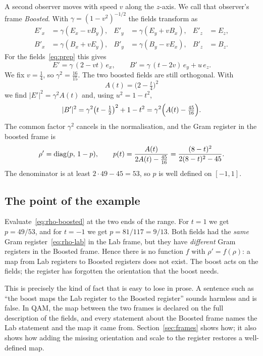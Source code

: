 A second observer moves with speed $v$ along the $z$-axis. We call that observer's frame \emph{Boosted}. With
$\gamma=(1-v^2)^{-1/2}$ the fields transform as
\[
\begin{aligned}
E'_x&=\gamma(E_x-vB_y), & E'_y&=\gamma(E_y+vB_x), & E'_z&=E_z,\\
B'_x&=\gamma(B_x+vE_y), & B'_y&=\gamma(B_y-vE_x), & B'_z&=B_z .
\end{aligned}
\]
For the fields~\eqref{eq:prep} this gives
\[
E' = \gamma\,(2-vt)\,e_x,\qquad B' = \gamma\,(t-2v)\,e_y + u\,e_z .
\]
We fix $v=\tfrac14$, so $\gamma^2=\tfrac{16}{15}$. The two boosted fields are still orthogonal. With
\[
A(t) = \bigl(2-\tfrac t4\bigr)^2
\]
we find $|E'|^2=\gamma^2A(t)$ and, using $u^2=1-t^2$,
\[
|B'|^2 = \gamma^2\bigl(t-\tfrac12\bigr)^2 + 1 - t^2 = \gamma^2\Bigl(A(t)-\tfrac{45}{16}\Bigr).
\]
The common factor $\gamma^2$ cancels in the normalisation, and the Gram register in the boosted frame is
\begin{equation}\label{eq:rho-boosted}
\rho' = \operatorname{diag}(p,\,1-p),\qquad p(t)=\frac{A(t)}{2A(t)-\frac{45}{16}}=\frac{(8-t)^2}{2(8-t)^2-45}.
\end{equation}
The denominator is at least $2\cdot 49-45=53$, so $p$ is well defined on $[-1,1]$.

\subsection{The point of the example}

Evaluate~\eqref{eq:rho-boosted} at the two ends of the range. For $t=1$ we get $p=49/53$, and for $t=-1$ we get $p=81/117=9/13$.
Both fields had the \emph{same} Gram register~\eqref{eq:rho-lab} in the Lab frame, but they have \emph{different} Gram registers in
the Boosted frame. Hence there is no function $f$ with $\rho'=f(\rho)$: a map from Lab registers to Boosted registers does not exist.
The boost acts on the fields; the register has forgotten the orientation that the boost needs.

This is precisely the kind of fact that is easy to lose in prose. A sentence such as ``the boost maps the Lab register to the Boosted
register'' sounds harmless and is false. In QAM, the map between the two frames is declared on the full description of the
fields, and every statement about the Boosted frame names the Lab statement and the map it came from. Section~\ref{sec:frames}
shows how; it also shows how adding the missing orientation and scale to the register restores a well-defined map.

